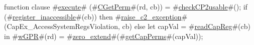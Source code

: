 function clause #\hyperref[zexecute]{execute}# (#\hyperref[zCGetPerm]{CGetPerm}#(rd, cb)) =
{
  #\hyperref[zcheckCPtwousable]{checkCP2usable}#();
  if (#\hyperref[zregisterzyinaccessible]{register\_inaccessible}#(cb)) then
    #\hyperref[zraisezyctwozyexception]{raise\_c2\_exception}#(CapEx_AccessSystemRegsViolation, cb)
  else
    let capVal = #\hyperref[zreadCapReg]{readCapReg}#(cb) in
    #\hyperref[zwGPR]{wGPR}#(rd) = #\hyperref[zzzerozyextend]{zero\_extend}#(#\hyperref[zgetCapPerms]{getCapPerms}#(capVal));
}
